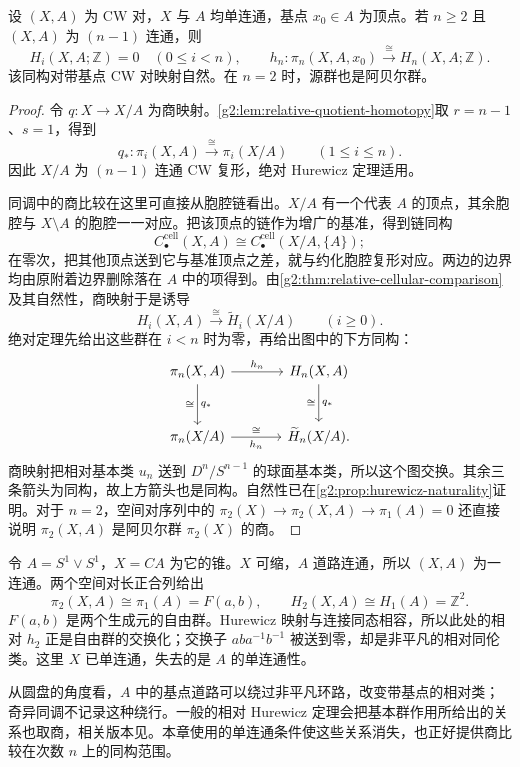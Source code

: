 \begin{theorem}[相对 Hurewicz 定理]\label{g2:thm:hurewicz-relative}
	设 \((X,A)\) 为 CW 对，\(X\) 与 \(A\) 均单连通，基点 \(x_0\in A\) 为顶点。若 \(n\ge2\) 且 \((X,A)\) 为 \((n-1)\) 连通，则
	\[
		H_i(X,A;\mathbb Z)=0\quad(0\le i<n),\qquad
		h_n:\pi_n(X,A,x_0)\xrightarrow{\ \cong\ }H_n(X,A;\mathbb Z).
	\]
	该同构对带基点 CW 对映射自然。在 \(n=2\) 时，源群也是阿贝尔群。
\end{theorem}
\begin{proof}
	令 \(q:X\to X/A\) 为商映射。\cref{g2:lem:relative-quotient-homotopy}取 \(r=n-1\)、\(s=1\)，得到
	\[
		q_*:\pi_i(X,A)\xrightarrow{\ \cong\ }\pi_i(X/A)\qquad(1\le i\le n).
	\]
	因此 \(X/A\) 为 \((n-1)\) 连通 CW 复形，绝对 Hurewicz 定理适用。

	同调中的商比较在这里可直接从胞腔链看出。\(X/A\) 有一个代表 \(A\) 的顶点，其余胞腔与 \(X\setminus A\) 的胞腔一一对应。把该顶点的链作为增广的基准，得到链同构
	\[
		C_\bullet^{\mathrm{cell}}(X,A)\cong
		C_\bullet^{\mathrm{cell}}(X/A,\{A\});
	\]
	在零次，把其他顶点送到它与基准顶点之差，就与约化胞腔复形对应。两边的边界均由原附着边界删除落在 \(A\) 中的项得到。由\cref{g2:thm:relative-cellular-comparison}及其自然性，商映射于是诱导
	\[
		H_i(X,A)\xrightarrow{\ \cong\ }\widetilde H_i(X/A)\qquad(i\ge0).
	\]
	绝对定理先给出这些群在 \(i<n\) 时为零，再给出图中的下方同构：
	\[
		\begin{tikzcd}[column sep=large,row sep=large]
			\pi_n(X,A) \arrow[r,"h_n"] \arrow[d,"q_*","\cong"'] & H_n(X,A) \arrow[d,"q_*","\cong"'] \\
			\pi_n(X/A) \arrow[r,"h_n"',"\cong"] & \widetilde H_n(X/A).
		\end{tikzcd}
	\]
	商映射把相对基本类 \(u_n\) 送到 \(D^n/S^{n-1}\) 的球面基本类，所以这个图交换。其余三条箭头为同构，故上方箭头也是同构。自然性已在\cref{g2:prop:hurewicz-naturality}证明。对于 \(n=2\)，空间对序列中的 \(\pi_2(X)\to\pi_2(X,A)\to\pi_1(A)=0\) 还直接说明 \(\pi_2(X,A)\) 是阿贝尔群 \(\pi_2(X)\) 的商。
\end{proof}

\begin{example}\label{g2:exm:hurewicz-nonsimply-connected}
	令 \(A=S^1\vee S^1\)，\(X=CA\) 为它的锥。\(X\) 可缩，\(A\) 道路连通，所以 \((X,A)\) 为一连通。两个空间对长正合列给出
	\[
		\pi_2(X,A)\cong\pi_1(A)=F(a,b),\qquad
		H_2(X,A)\cong H_1(A)=\mathbb Z^2.
	\]
	\(F(a,b)\) 是两个生成元的自由群。Hurewicz 映射与连接同态相容，所以此处的相对 \(h_2\) 正是自由群的交换化；交换子 \(aba^{-1}b^{-1}\) 被送到零，却是非平凡的相对同伦类。这里 \(X\) 已单连通，失去的是 \(A\) 的单连通性。
\end{example}

从圆盘的角度看，\(A\) 中的基点道路可以绕过非平凡环路，改变带基点的相对类；奇异同调不记录这种绕行。一般的相对 Hurewicz 定理会把基本群作用所给出的关系也取商，相关版本见\cite[第4.2节，The Hurewicz Theorem]{Hatcher2002}。本章使用的单连通条件使这些关系消失，也正好提供商比较在次数 \(n\) 上的同构范围。
